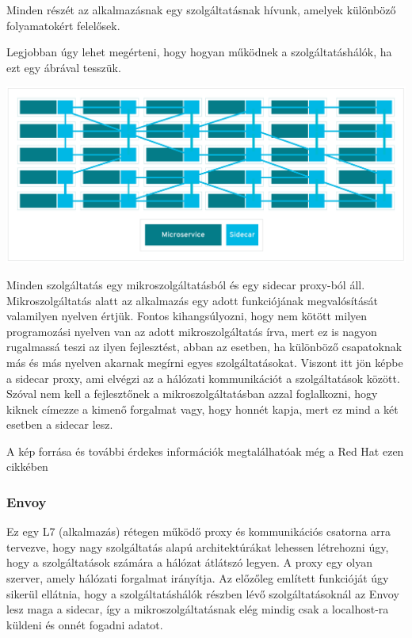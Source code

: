 \documentclass[a4paper,oneside]{article}
\begin{document}
Minden részét az alkalmazásnak egy szolgáltatásnak hívunk, amelyek
különböző folyamatokért felelősek.

Legjobban úgy lehet megérteni, hogy hogyan működnek a szolgáltatáshálók, ha
ezt egy ábrával tesszük.
\begin{center}
\includegraphics[width=\textwidth]{serviceMesh}
\end{center}
Minden szolgáltatás egy mikroszolgáltatásból és egy sidecar proxy-ból áll.
Mikroszolgáltatás alatt az alkalmazás egy adott funkciójának megvalósítását
valamilyen nyelven értjük. Fontos kihangsúlyozni, hogy nem kötött milyen
programozási nyelven van az adott mikroszolgáltatás írva, mert ez is
nagyon rugalmassá teszi az ilyen fejlesztést, abban az esetben, ha
különböző csapatoknak más és más nyelven akarnak megírni egyes szolgáltatásokat.
Viszont itt jön képbe a sidecar proxy, ami elvégzi az a hálózati
kommunikációt a szolgáltatások között. Szóval nem kell a fejlesztőnek
a mikroszolgáltatásban azzal foglalkozni, hogy kiknek címezze a kimenő
forgalmat vagy, hogy honnét kapja, mert ez mind a két esetben a sidecar lesz.

A kép forrása és további érdekes információk megtalálhatóak még a Red Hat ezen
cikkében ~\cite{redhat}

\subsubsection{Envoy}
Ez egy L7 (alkalmazás) rétegen működő proxy és kommunikációs csatorna
arra tervezve, hogy nagy szolgáltatás alapú architektúrákat lehessen létrehozni
úgy, hogy a szolgáltatások számára a hálózat átlátszó legyen.
A proxy egy olyan szerver, amely hálózati forgalmat irányítja. Az előzőleg
említett funkcióját úgy sikerül ellátnia, hogy a szolgáltatáshálók
részben lévő szolgáltatásoknál az Envoy lesz maga a sidecar, így a
mikroszolgáltatásnak elég mindig csak a localhost-ra küldeni és onnét
fogadni adatot.
\end{document}
